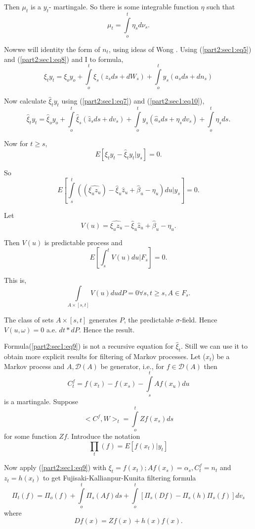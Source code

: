 Then $\mu_t$ is a $y_t$- martingale. So there is some integrable
function $\eta$ such that 
\begin{equation}
  \mu_t= \int\limits_{o}^t \eta_s d \nu_s. \tag{10}\label{part2:sec1:eq10}
\end{equation}

Now\pageoriginale we will identity the form of $n_t$, using ideas of Wong
\cite{key28}. Using (\ref{part2:sec1:eq5}) and (\ref{part2:sec1:eq8})
and I to formula,  
$$
\xi_t y_t=\xi_o y_o + \int \limits_o^t \xi_s (z_s ds +dW_s)+ \int
\limits ^t_o y_s(a_s ds+dn_s) 
$$

Now calculate $\hat{\xi}_t y_t$ using (\ref{part2:sec1:eq7}) and
(\ref{part2:sec1:eq10}), 
$$
\hat{\xi}_t y_t=\hat{\xi}_o y_o+\int \limits ^t_o \hat{\xi}_s
(\hat{z}_s ds +dv_s)+\int \limits ^t_o y_s (\hat{a}_s ds +\eta_sdv_s)
+\int \limits^t_o \eta _s ds. 
$$

Now for $t \geq s$,
$$
E\left[\xi_t y_t- \hat{\xi}_t y_t|y_s\right]=0.
$$

So
$$
E \left[\int\limits^t_s \left((\widehat {\xi_u z_u})
-\hat{\xi}_u \hat{z}_u +\hat{\beta}_u -{\eta}_u\right) du |y_s \right] =0. 
$$

Let
$$
V(u)=\widehat{\xi_u z_u}-\hat{\xi}_u\hat{z}_u+\hat{\beta}_u-\eta_u.
$$

Then $V(u)$ is predictable process and
$$
E\left[\int^t_s V(u)du|F_s\right]=0.
$$

This is,
$$
\int \limits _{A \times [s,t]}V(u)du dP=0 \forall s,t \geq s, A \in
F_s. 
$$

The class of sets $A \times [s,t]$ generates $P$, the predictable
    $\sigma$-field. Hence $V(u, \omega) =0$ a.e. $dt * dP$. Hence the
    result. 

    Formula\pageoriginale (\ref{part2:sec1:eq9}) is not a recursive equation for
    $\hat{\xi}_t$. Still 
    we can use it to obtain more explicit results for filtering of
    Markov processes. Let ($x_t$) be a Markov process and
    $A,\mathcal{D}(A)$ be generator, i.e., for $f \in \mathcal{D}(A)$
    then 
$$
C^f_t = f(x_t)-f(x_s)- \int \limits ^t_s Af(x_u)du 
$$
is a martingale. Suppose
$$
<C^f, W>_t = \int \limits^t_o Zf(x_s)ds
$$
for some function $Zf$. Introduce the notation
$$
\prod_t (f)=E[f(x_t)|y_t]
$$

Now apply (\ref{part2:sec1:eq9}) with $\xi_t=f(x_t); Af(x_s)=\alpha_s, C^f_t=n_t$ and
$z_t=h(x_t)$ to get Fujisaki-Kallianpur-Kunita filtering formula 
\begin{equation*}
  \Pi_t(f)= \Pi_o (f)+ \int \limits^t_o \Pi_s (Af)ds+ \int \limits^t_o
     \left[\Pi_s (Df)-\Pi_s (h)\Pi_s (f)\right]dv_s  \tag{11}\label{part2:sec1:eq11}  
\end{equation*}
where 
$$
Df(x)=Zf(x)+h(x)f(x). 
$$

